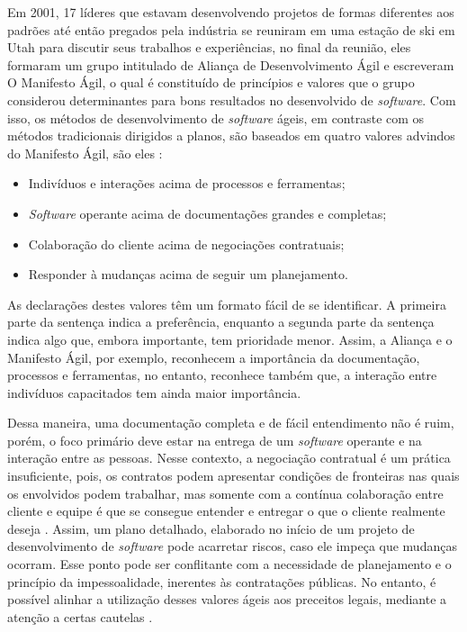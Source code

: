 Em 2001, 17 líderes que estavam desenvolvendo projetos de formas diferentes aos padrões até então pregados pela indústria se reuniram em uma estação de ski em Utah para discutir seus trabalhos e experiências, no final da reunião, eles formaram um grupo intitulado de Aliança de Desenvolvimento Ágil e escreveram O Manifesto Ágil, o qual é constituído de princípios e valores que o grupo considerou determinantes para bons resultados no desenvolvido de \textit{software}. Com isso, os métodos de desenvolvimento de \textit{software} ágeis, em contraste com os métodos tradicionais dirigidos a planos, são baseados em quatro valores advindos do Manifesto Ágil, são eles \cite{manifesto}:
\begin{itemize}
\item Indivíduos e interações acima de processos e ferramentas;
\item \textit{Software} operante acima de documentações grandes e completas;
\item Colaboração do cliente acima de negociações contratuais;
\item Responder à mudanças acima de seguir um planejamento.
\end{itemize}

As declarações destes valores têm um formato fácil de se identificar. A primeira parte da sentença indica a preferência, enquanto a segunda parte da sentença indica algo que, embora importante, tem prioridade menor. Assim, a Aliança e o Manifesto Ágil, por exemplo, reconhecem a importância da documentação, processos e ferramentas, no entanto, reconhece também que, a interação entre indivíduos capacitados tem ainda maior importância.

Dessa maneira, uma documentação completa e de fácil entendimento não é ruim, porém, o foco primário deve estar na entrega de um  \textit{software} operante e na interação entre as pessoas. Nesse contexto, a negociação contratual é um prática insuficiente, pois, os contratos podem apresentar condições de fronteiras nas quais os envolvidos podem trabalhar, mas somente com a contínua colaboração entre cliente e equipe é que se consegue entender e entregar o que o cliente realmente deseja \cite{jim}. Assim, um plano detalhado, elaborado no início de um projeto de desenvolvimento de \textit{software} pode acarretar riscos, caso ele impeça que mudanças ocorram. Esse ponto pode ser conflitante com a necessidade de planejamento e o princípio da impessoalidade, inerentes às contratações públicas. No entanto, é possível alinhar a utilização desses valores ágeis aos preceitos legais, mediante a atenção a certas cautelas \cite{TCU:2013}.

